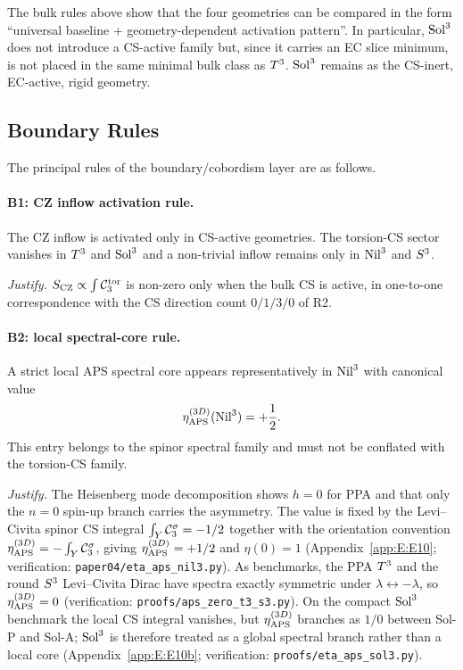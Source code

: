 The bulk rules above show that the four geometries can be compared in the
form ``universal baseline + geometry-dependent activation pattern''.  In
particular, $\mathrm{Sol}^3$ does not introduce a CS-active family but, since it
carries an EC slice minimum, is not placed in the same minimal bulk class as
$T^3$.  $\mathrm{Sol}^3$ remains as the CS-inert, EC-active, rigid geometry.

\subsection{Boundary Rules}
\label{sec:rules:boundary}

The principal rules of the boundary/cobordism layer are as follows.

\paragraph{B1: CZ inflow activation rule.}
The CZ inflow is activated only in CS-active geometries.  The torsion-CS
sector vanishes in $T^3$ and $\mathrm{Sol}^3$ and a non-trivial inflow
remains only in $\mathrm{Nil}^3$ and $S^3$.

\textit{Justify.}  $S_{\mathrm{CZ}}\propto\int\mathcal{C}_3^{\mathrm{tor}}$ is non-zero only when the bulk CS is
active, in one-to-one correspondence with the CS direction count
$0/1/3/0$ of R2.

\paragraph{B2: local spectral-core rule.}
A strict local APS spectral core appears representatively in $\mathrm{Nil}^3$
with canonical value
\begin{equation}
  \eta_{\mathrm{APS}}^{(3D)}(\mathrm{Nil}^3) = +\frac{1}{2}.
\end{equation}
This entry belongs to the spinor spectral family and must not be conflated
with the torsion-CS family.

\textit{Justify.}  The Heisenberg mode decomposition shows $h=0$ for PPA and
that only the $n=0$ spin-up branch carries the asymmetry.  The value is
fixed by the Levi--Civita spinor CS integral $\int_Y\mathcal{C}_3^{\sigma} = -1/2$ together
with the orientation convention $\eta_{\mathrm{APS}}^{(3D)} = -\int_Y\mathcal{C}_3^{\sigma}$, giving
$\eta_{\mathrm{APS}}^{(3D)} = +1/2$ and $\eta(0) = 1$ (Appendix~\ref{app:E:E10};
verification: \texttt{paper04/eta\_aps\_nil3.py}).  As benchmarks, the PPA
$T^3$ and the round $S^3$ Levi--Civita Dirac have spectra exactly
symmetric under $\lambda\leftrightarrow -\lambda$, so $\eta_{\mathrm{APS}}^{(3D)} = 0$
(verification: \texttt{proofs/aps\_zero\_t3\_s3.py}).  On the compact
$\mathrm{Sol}^3$ benchmark the local CS integral vanishes, but $\eta_{\mathrm{APS}}^{(3D)}$
branches as $1/0$ between Sol-P and Sol-A; $\mathrm{Sol}^3$ is therefore treated
as a global spectral branch rather than a local core
(Appendix~\ref{app:E:E10b}; verification:
\texttt{proofs/eta\_aps\_sol3.py}).


